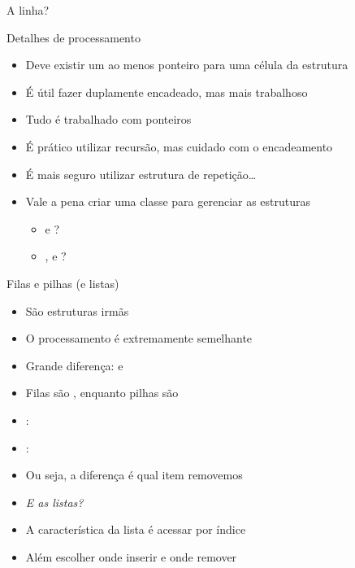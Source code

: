 \documentclass[14pt]{beamer}
\begin{document}
		\begin{frame}{A linha?}
			\begin{figure}[H]
				\centering
				
				\label{fig.dataStructure.close}
			\end{figure}
		\end{frame}

		\begin{frame}{Detalhes de processamento}
			\begin{itemize}
				\presentationPause\item Deve existir um ao menos ponteiro para uma célula da estrutura
				\presentationPause\item É útil fazer duplamente encadeado, mas mais trabalhoso
				\presentationPause\item Tudo é trabalhado com ponteiros
				\presentationPause\item É prático utilizar recursão\presentationPause, mas cuidado com o encadeamento
				\presentationPause\item É mais seguro utilizar estrutura de repetição\dots
				\presentationPause\item Vale a pena criar uma classe para gerenciar as estruturas
				\begin{itemize}
					\presentationPause\item {} e ?
					\presentationPause\item {},  e ?
				\end{itemize}
			\end{itemize}
		\end{frame}

		\begin{frame}{Filas e pilhas (e listas)}
			\begin{itemize}
				\presentationPause\item São estruturas irmãs
				\presentationPause\item O processamento é extremamente semelhante
				\presentationPause\item Grande diferença: \presentationPause {} e 
				\presentationPause\item Filas são , enquanto pilhas são 
				\presentationPause\item {}: 
				\presentationPause\item {}: 
				\presentationPause\item Ou seja, a diferença é qual item removemos
				\presentationPause\item \textit{E as listas?}
				\presentationPause\item A característica da lista é acessar por índice
				\presentationPause\item Além escolher onde inserir e onde remover
			\end{itemize}
		\end{frame}
\end{document}
